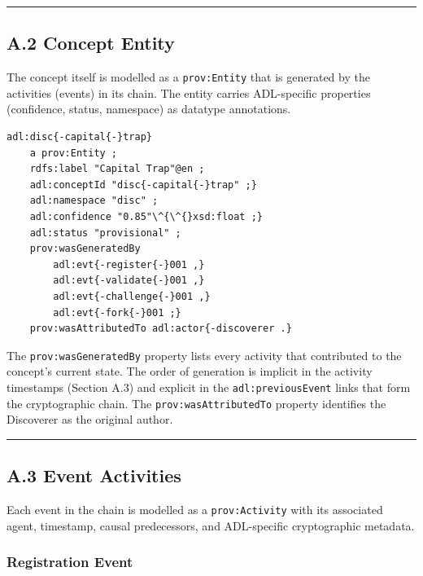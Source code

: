 \begin{center}\rule{0.5\linewidth}{0.5pt}\end{center}


\subsection{A.2 Concept Entity}\label{a.2-concept-entity}

The concept itself is modelled as a \texttt{prov:Entity} that is generated by the activities (events) in its chain. The entity carries ADL-specific properties (confidence, status, namespace) as datatype annotations.

\begin{lstlisting}
adl:disc{-capital{-}trap}
    a prov:Entity ;
    rdfs:label "Capital Trap"@en ;
    adl:conceptId "disc{-capital{-}trap" ;}
    adl:namespace "disc" ;
    adl:confidence "0.85"\^{\^{}xsd:float ;}
    adl:status "provisional" ;
    prov:wasGeneratedBy
        adl:evt{-register{-}001 ,}
        adl:evt{-validate{-}001 ,}
        adl:evt{-challenge{-}001 ,}
        adl:evt{-fork{-}001 ;}
    prov:wasAttributedTo adl:actor{-discoverer .}
\end{lstlisting}

The \texttt{prov:wasGeneratedBy} property lists every activity that contributed to the concept's current state. The order of generation is implicit in the activity timestamps (Section A.3) and explicit in the \texttt{adl:previousEvent} links that form the cryptographic chain. The \texttt{prov:wasAttributedTo} property identifies the Discoverer as the original author.

\begin{center}\rule{0.5\linewidth}{0.5pt}\end{center}


\subsection{A.3 Event Activities}\label{a.3-event-activities}

Each event in the chain is modelled as a \texttt{prov:Activity} with its associated agent, timestamp, causal predecessors, and ADL-specific cryptographic metadata.

\subsubsection{Registration Event}\label{a.3.1-registration-event}


